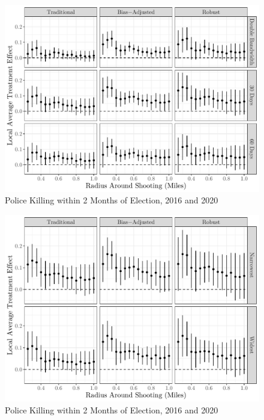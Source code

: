 \documentclass[
  12pt,
]{article}
\begin{document}
\begin{figure}[h]

{\centering \includegraphics{shoot_to_files/figure-latex/bws-1} 

}

\caption{\label{fig:map}Police Killing within 2 Months of Election, 2016 and 2020}\label{fig:bws}
\end{figure}

\begin{figure}[h]

{\centering \includegraphics{shoot_to_files/figure-latex/bws-2-1} 

}

\caption{\label{fig:map}Police Killing within 2 Months of Election, 2016 and 2020}\label{fig:bws-2}
\end{figure}
\end{document}
